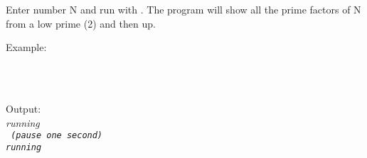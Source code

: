 \documentclass[a4paper, landscape]{article}
\begin{document}
\bigskip
Enter number N and run with \RStwc. The program will show all the prime factors of N from a low prime (2) and then up.

\bigskip
\noindent
Example:

\tt
\indent {} \\
\indent \RStwc \\
\rm

\bigskip

Output:\\
\it running \rm \\
\tt {} \indent \it (pause one second)\\
\it running \rm \\
\tt {} \\
\rm

\bigskip
\end{document}

